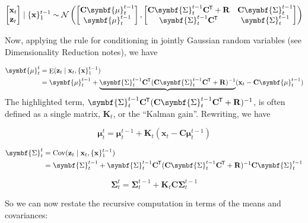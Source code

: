 \documentclass[11pt]{article}
\DeclareMathOperator{\E}{E}
\DeclareMathOperator{\Cov}{Cov}
\newcommand{\xb}{\mathbf{x}}
\newcommand{\zb}{\mathbf{z}}
\newcommand{\ub}{\symbf{\mu}}
\newcommand{\Sb}{\symbf{\Sigma}}
\newcommand{\Cb}{\mathbf{C}}
\newcommand{\Rb}{\mathbf{R}}
\newcommand*{\tran}{^{\mkern-1.5mu\mathsf{T}}}
\begin{document}
\begin{equation*}
  \begin{bmatrix}\xb_t \\ \zb_t\end{bmatrix} \mid \{\xb\}_1^{t-1} \sim
    \mathcal{N}\left( \begin{bmatrix}\Cb \ub_t^{t-1} \\ \ub_t^{t-1}\end{bmatrix},
      \begin{bmatrix}\Cb \Sb_t^{t-1} \Cb\tran + \Rb & \Cb \Sb_t^{t-1} \\
                     \Sb_t^{t-1} \Cb\tran &
                     \Sb_t^{t-1}\end{bmatrix}
    \right)
\end{equation*}

Now, applying the rule for conditioning in jointly Gaussian random variables
(see Dimensionality Reduction notes), we have

\begin{align*}
  \ub_t^t &= \E(\zb_t \mid \xb_t, \{\xb\}_1^{t-1}) \\
      &= \ub_t^{t-1} + \underbrace{\Sb_t^{t-1} \Cb\tran
          (\Cb \Sb_t^{t-1} \Cb\tran + \Rb)^{-1}}
          (\xb_t - \Cb \ub_t^{t-1})
\end{align*}
The highlighted term, $\Sb_t^{t-1} \Cb\tran (\Cb \Sb_t^{t-1} \Cb\tran + \Rb)^{-1}$,
is often defined as a single matrix, $\mathbf{K}_t$, or the ``Kalman gain''.
Rewriting, we have
\begin{framed}
  \begin{equation}
    \ub_t^t = \ub_t^{t-1} + \mathbf{K}_t (\xb_t - \Cb \ub_t^{t-1})
  \end{equation}
\end{framed}

\begin{align*}
  \Sb_t^t &= \Cov(\zb_t \mid \xb_t, \{\xb\}_1^{t-1}) \\
      &= \Sb_t^{t-1} + \Sb_t^{t-1} \Cb\tran
      (\Cb \Sb_t^{t-1} \Cb\tran + \Rb)^{-1} \Cb \Sb_t^{t-1}
\end{align*}

\begin{framed}
  \begin{equation}
    \Sb_t^t = \Sb_t^{t-1} + \mathbf{K}_t \Cb \Sb_t^{t-1}
  \end{equation}
\end{framed}

So we can now restate the recursive computation in terms of the means and
covariances:
\end{document}
